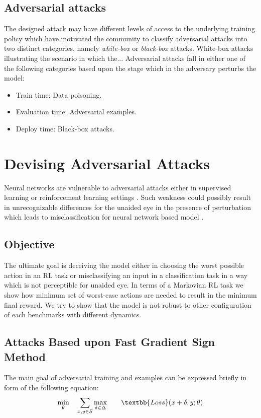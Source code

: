 \documentclass[letterpaper,12pt]{article}
\begin{document}
\subsection{Adversarial attacks}
The designed attack may have different levels of access to the underlying training policy which have motivated the community to classify adversarial attacks into two distinct categories, namely \textit{white-box} or \textit{black-box} attacks. White-box attacks illustrating the scenario in which the... Adversarial attacks fall in either one of the following categories based upon the stage which in the adversary perturbs the model:
\begin{itemize}
    \item Train time: Data poisoning.
    \item Evaluation time: Adversarial examples.
    \item Deploy time: Black-box attacks.
\end{itemize}


\section{Devising Adversarial Attacks}
Neural networks are vulnerable to adversarial attacks either in supervised learning or reinforcement learning settings \cite{Huang2017}. Such weakness could possibly result in unrecognizable differences for the unaided eye in the presence of perturbation which leads to misclassification for neural network based model \cite{Szegedy2014, Goodfellow2014}. 

\subsection{Objective}
The ultimate goal is deceiving the model either in choosing the worst possible action in an RL task or misclassifying an input in a classification task in a way which is not perceptible for unaided eye. In terms of a Markovian RL task we show how minimum set of worst-case actions are needed to result in the minimum final reward. We try to show that the model is not robust to other configuration of each benchmarks with different dynamics.


\subsection{Attacks Based upon Fast Gradient Sign Method}

The main goal of adversarial training and examples can be expressed briefly in form of the following equation:
\begin{equation}
\begin{aligned}
& \underset{\theta}{\min}
& & \sum_{x,y \in S} \underset{\delta \in \Delta}{\max}
& & & \textbb{Loss}(x + \delta, y; \theta)
\end{aligned}
\end{equation}
\end{document}
